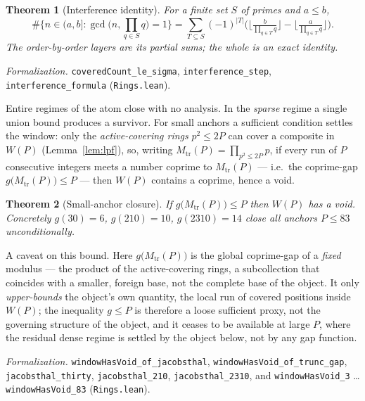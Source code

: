 \documentclass[11pt,a4paper]{amsart}
\theoremstyle{plain}
\newtheorem{theorem}{Theorem}[section]
\theoremstyle{definition}
\theoremstyle{plain}
\theoremstyle{remark}
\newcommand{\lean}[1]{\textup{\texttt{#1}}}
\newcommand{\Formal}[1]{\par\smallskip\noindent\emph{Formalization.} #1\par\smallskip}
\begin{document}
\begin{theorem}[Interference identity]\label{thm:legendre}
For a finite set $S$ of primes and $a\le b$,
\[
\#\Big\{n\in(a,b]:\gcd\big(n,\textstyle\prod_{q\in S}q\big)=1\Big\}
=\sum_{T\subseteq S}(-1)^{|T|}
\Big(\big\lfloor\tfrac{b}{\prod_{q\in T}q}\big\rfloor
-\big\lfloor\tfrac{a}{\prod_{q\in T}q}\big\rfloor\Big).
\]
The order-by-order layers are its partial sums; the whole is an exact identity.
\end{theorem}

\Formal{\lean{coveredCount\_le\_sigma}, \lean{interference\_step},
\lean{interference\_formula} (\lean{Rings.lean}).}

Entire regimes of the atom close with no analysis. In the \emph{sparse} regime a single
union bound produces a survivor. For small anchors a sufficient condition settles the
window: only the \emph{active-covering rings} $p^2\le 2P$ can cover a composite in $W(P)$
(Lemma~\ref{lem:lpf}), so, writing $M_{\mathrm{tr}}(P)=\prod_{p^2\le 2P}p$, if every run of
$P$ consecutive integers meets a number coprime to $M_{\mathrm{tr}}(P)$ --- i.e.\ the
coprime-gap $g\big(M_{\mathrm{tr}}(P)\big)\le P$ --- then $W(P)$ contains a coprime, hence a
void.

\begin{theorem}[Small-anchor closure]\label{thm:jac}
If $g\big(M_{\mathrm{tr}}(P)\big)\le P$ then $W(P)$ has a void. Concretely $g(30)=6$,
$g(210)=10$, $g(2310)=14$ close all anchors $P\le 83$ unconditionally.
\end{theorem}

A caveat on this bound. Here $g\big(M_{\mathrm{tr}}(P)\big)$ is the global coprime-gap of a
\emph{fixed} modulus --- the product of the active-covering rings, a subcollection that
coincides with a smaller, foreign base, not the complete base of the object. It only
\emph{upper-bounds} the object's own quantity, the local run of covered positions inside
$W(P)$; the inequality $g\le P$ is therefore a loose sufficient proxy, not the governing
structure of the object, and it ceases to be available at large $P$, where the residual
dense regime is settled by the object below, not by any gap function.

\Formal{\lean{windowHasVoid\_of\_jacobsthal}, \lean{windowHasVoid\_of\_trunc\_gap},
\lean{jacobsthal\_thirty}, \lean{jacobsthal\_210}, \lean{jacobsthal\_2310}, and
\lean{windowHasVoid\_3} \dots \lean{windowHasVoid\_83} (\lean{Rings.lean}).}
\end{document}
